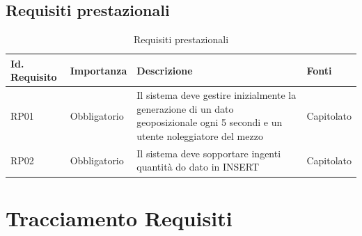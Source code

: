 \documentclass[11pt]{article}
\begin{document}
\begin{justify}
\subsection{Requisiti prestazionali}

\begin{table}[H]
\centering
\renewcommand{\arraystretch}{1.5}
\begin{tabular}{|>{\centering\arraybackslash}m{2.7cm}|>{\centering\arraybackslash}m{2.7cm}|>{\centering\arraybackslash}m{6cm}|>{\centering\arraybackslash}m{2.1cm}|}
\hline
\textbf{Id. Requisito} & \textbf{Importanza} & \textbf{Descrizione} & \textbf{Fonti}\\
\hline
RP01 & Obbligatorio &  Il sistema deve gestire inizialmente la generazione di un dato geoposizionale ogni 5 secondi e un utente noleggiatore del mezzo & Capitolato\\
\hline
RP02 & Obbligatorio &  Il sistema deve sopportare ingenti quantità do dato in INSERT & Capitolato\\
\hline
\end{tabular}
\caption{Requisiti prestazionali}
\end{table}



\newpage
\section{Tracciamento Requisiti}


\end{justify}
\end{document}
